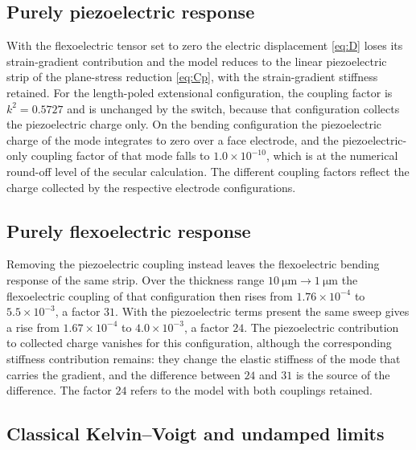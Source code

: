 \FloatBarrier
\subsection{Purely piezoelectric response}
\label{sec:limit_piezo}

With the flexoelectric tensor set to zero the electric displacement
\eqref{eq:D} loses its strain-gradient contribution and the model reduces to
the linear piezoelectric strip of the plane-stress reduction \eqref{eq:Cp},
with the strain-gradient stiffness retained. For the length-poled extensional configuration, the coupling factor is $k^2=0.5727$ and is unchanged
by the switch, because that configuration collects the piezoelectric charge
only. On the bending configuration the piezoelectric charge of the mode
integrates to zero over a face electrode, and the piezoelectric-only coupling
factor of that mode falls to $1.0\times10^{-10}$, which is at the numerical round-off level of the secular calculation. The different coupling factors reflect the charge collected by the
respective electrode configurations.

\FloatBarrier
\subsection{Purely flexoelectric response}
\label{sec:limit_flexo}

Removing the piezoelectric coupling instead leaves the flexoelectric bending
response of the same strip. Over the thickness range
$\SI{10}{\micro\meter}\to\SI{1}{\micro\meter}$ the flexoelectric coupling of
that configuration then rises from $1.76\times10^{-4}$ to
$5.5\times10^{-3}$, a factor $31$. With the piezoelectric terms present the
same sweep gives a rise from $1.67\times10^{-4}$ to $4.0\times10^{-3}$, a
factor $24$. The piezoelectric contribution to collected charge vanishes for this
configuration, although the corresponding stiffness contribution remains: they change the elastic stiffness of the
mode that carries the gradient, and the difference between $24$ and $31$ is
the source of the difference. The factor $24$ refers to the model
with both couplings retained.

\FloatBarrier
\subsection{Classical Kelvin--Voigt and undamped limits}
\label{sec:limit_memory}

